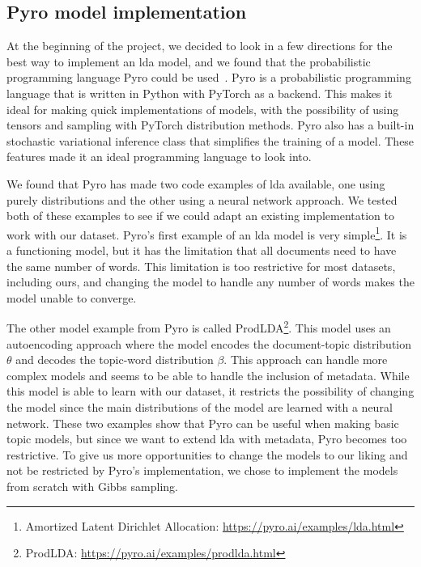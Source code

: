 \subsection{Pyro model implementation}
At the beginning of the project, we decided to look in a few directions for the best way to implement an \gls{lda} model, and we found that the probabilistic programming language Pyro could be used~\cite{bingham2019pyro}.
Pyro is a probabilistic programming language that is written in Python with PyTorch as a backend.
This makes it ideal for making quick implementations of models, with the possibility of using tensors and sampling with PyTorch distribution methods.
Pyro also has a built-in stochastic variational inference class that simplifies the training of a model.
These features made it an ideal programming language to look into.

We found that Pyro has made two code examples of \gls{lda} available, one using purely distributions and the other using a neural network approach.
We tested both of these examples to see if we could adapt an existing implementation to work with our dataset.
Pyro's first example of an \gls{lda} model is very simple\footnote{Amortized Latent Dirichlet Allocation: \url{https://pyro.ai/examples/lda.html}}.
It is a functioning model, but it has the limitation that all documents need to have the same number of words.
This limitation is too restrictive for most datasets, including ours, and changing the model to handle any number of words makes the model unable to converge.

The other model example from Pyro is called ProdLDA\footnote{ProdLDA: \url{https://pyro.ai/examples/prodlda.html}}.
This model uses an autoencoding approach where the model encodes the document-topic distribution $\theta$ and decodes the topic-word distribution $\beta$.
This approach can handle more complex models and seems to be able to handle the inclusion of metadata.
While this model is able to learn with our dataset, it restricts the possibility of changing the model since the main distributions of the model are learned with a neural network.
These two examples show that Pyro can be useful when making basic topic models, but since we want to extend \gls{lda} with metadata, Pyro becomes too restrictive.
To give us more opportunities to change the models to our liking and not be restricted by Pyro's implementation, we chose to implement the models from scratch with Gibbs sampling.